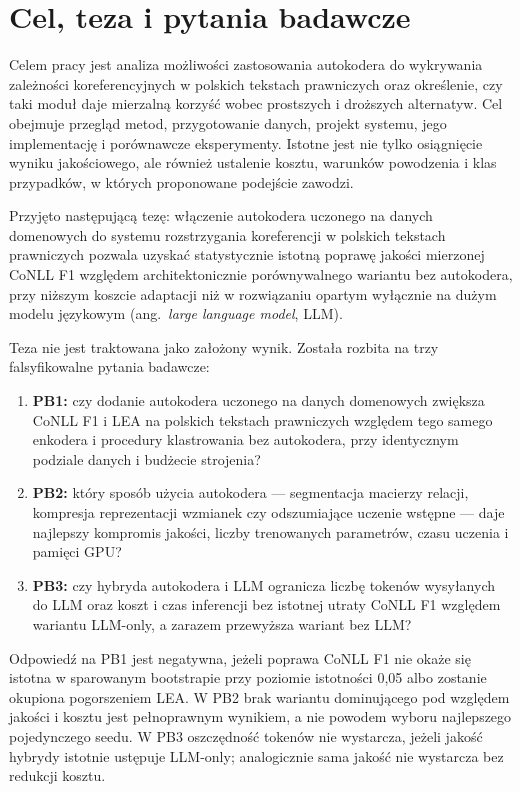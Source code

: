 \section{Cel, teza i pytania badawcze}
\label{sec:cel-teza}

Celem pracy jest analiza możliwości zastosowania autokodera do wykrywania zależności koreferencyjnych w polskich tekstach prawniczych oraz określenie, czy taki moduł daje mierzalną korzyść wobec prostszych i droższych alternatyw. Cel obejmuje przegląd metod, przygotowanie danych, projekt systemu, jego implementację i porównawcze eksperymenty. Istotne jest nie tylko osiągnięcie wyniku jakościowego, ale również ustalenie kosztu, warunków powodzenia i klas przypadków, w których proponowane podejście zawodzi.

Przyjęto następującą tezę: włączenie autokodera uczonego na danych domenowych do systemu rozstrzygania koreferencji w polskich tekstach prawniczych pozwala uzyskać statystycznie istotną poprawę jakości mierzonej CoNLL F1 względem architektonicznie porównywalnego wariantu bez autokodera, przy niższym koszcie adaptacji niż w rozwiązaniu opartym wyłącznie na dużym modelu językowym (ang.\ \emph{large language model}, LLM).

Teza nie jest traktowana jako założony wynik. Została rozbita na trzy falsyfikowalne pytania badawcze:

\begin{enumerate}
  \item \textbf{PB1:} czy dodanie autokodera uczonego na danych domenowych zwiększa CoNLL F1 i LEA na polskich tekstach prawniczych względem tego samego enkodera i procedury klastrowania bez autokodera, przy identycznym podziale danych i budżecie strojenia?
  \item \textbf{PB2:} który sposób użycia autokodera --- segmentacja macierzy relacji, kompresja reprezentacji wzmianek czy odszumiające uczenie wstępne --- daje najlepszy kompromis jakości, liczby trenowanych parametrów, czasu uczenia i pamięci GPU?
  \item \textbf{PB3:} czy hybryda autokodera i LLM ogranicza liczbę tokenów wysyłanych do LLM oraz koszt i czas inferencji bez istotnej utraty CoNLL F1 względem wariantu LLM-only, a zarazem przewyższa wariant bez LLM?
\end{enumerate}

Odpowiedź na PB1 jest negatywna, jeżeli poprawa CoNLL F1 nie okaże się istotna w sparowanym bootstrapie przy poziomie istotności 0,05 albo zostanie okupiona pogorszeniem LEA. W PB2 brak wariantu dominującego pod względem jakości i kosztu jest pełnoprawnym wynikiem, a nie powodem wyboru najlepszego pojedynczego seedu. W PB3 oszczędność tokenów nie wystarcza, jeżeli jakość hybrydy istotnie ustępuje LLM-only; analogicznie sama jakość nie wystarcza bez redukcji kosztu.

